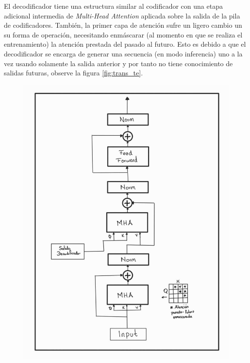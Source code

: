 El decodificador tiene una estructura similar al codificador con una etapa adicional intermedia
de \textit{Multi-Head Attention} aplicada sobre la salida de la pila de codificadores. También, la
primer capa de atención sufre un ligero cambio un su forma de operación, necesitando enmáscarar (al
momento en que se realiza el entrenamiento) la atención prestada del pasado al futuro. Esto es
debido a que el decodificador se encarga de generar una secuencia (en modo inferencia) uno a la vez
usando solamente la salida anterior y por tanto no tiene conocimiento de salidas futuras, observe
la figura \ref{fig:trans_te}.

\begin{figure}[ht!]
\centering
    \begin{minipage}{.4\textwidth}
        \centering
        \includegraphics[width=1.0 \textwidth]{Chapters/2. Transformer/Figures/transformer/decoder.jpg}
    \end{minipage}
    \begin{minipage}{.5\textwidth}

\end{minipage}
\end{figure}
